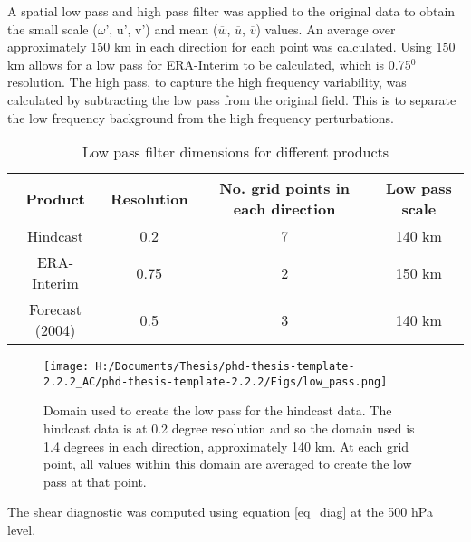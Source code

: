 
A spatial low pass and high pass filter was applied to the original data to obtain the small scale (${\omega}$', u', v') and mean ($\overline{w}$, $\overline{u}$, $\overline{v}$) values. An average over approximately 150 km in each direction for each point was calculated. Using 150 km allows for a low pass for ERA-Interim to be calculated, which is 0.75$^0$ resolution. The high pass, to capture the high frequency variability, was calculated by subtracting the low pass from the original field. This is to separate the low frequency background from the high frequency perturbations.

\begin{table}
	\caption{Low pass filter dimensions for different products}\label{t_lowpass}
	\begin{center}
		\begin{tabular}{cccc}
			\hline\hline
			Product & Resolution & No. grid points in each direction & Low pass scale \\
			\hline
			Hindcast & 0.2 & 7 & 140 km \\ 
			ERA-Interim & 0.75  & 2 & 150 km \\
			Forecast (2004) & 0.5 &  3 & 140 km \\ %
			
			\hline
		\end{tabular}
	\end{center}
\end{table}


\begin{figure}
	\centering	
	\texttt{[image: H:/Documents/Thesis/phd-thesis-template-2.2.2\_AC/phd-thesis-template-2.2.2/Figs/low\_pass.png]}
	\caption{Domain used to create the low pass for the hindcast data.  The hindcast data is at 0.2 degree resolution and so the domain used is 1.4 degrees in each direction, approximately 140 km. At each grid point, all values within this domain are averaged to create the low pass at that point.}\label{fig:low_pass}
	\centering
\end{figure}

The shear diagnostic was computed using equation \ref{eq_diag} at the 500 hPa level.

